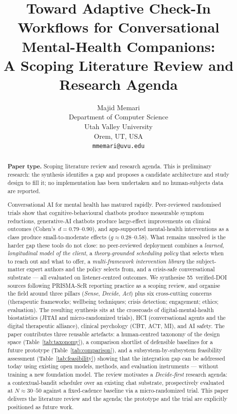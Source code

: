 \documentclass[10pt,conference]{article}
\title{Toward Adaptive Check-In Workflows for Conversational
Mental-Health Companions:\\A Scoping Literature Review and Research
Agenda}
\author{Majid Memari\\
Department of Computer Science\\
Utah Valley University\\
Orem, UT, USA\\
\texttt{mmemari@uvu.edu}}
\date{}
\newcommand{\tabref}[1]{Table~\ref{#1}}
\begin{document}
\maketitle

\begin{abstract}
\noindent\textbf{Paper type.} Scoping literature review and research
agenda. This is preliminary research: the synthesis identifies a gap
and proposes a candidate architecture and study design to fill it; no
implementation has been undertaken and no human-subjects data are
reported.

\smallskip
\noindent
Conversational AI for mental health has matured rapidly. Peer-reviewed
randomised trials show that cognitive-behavioural chatbots produce
measurable symptom reductions, generative-AI chatbots produce
large-effect improvements on clinical outcomes
(Cohen's~$d\!=\!0.79\text{--}0.90$), and app-supported mental-health
interventions as a class produce small-to-moderate effects
($g\!\approx\!0.28\text{--}0.58$). What remains unsolved is the harder
gap these tools do not close: no peer-reviewed deployment combines a
\emph{learned, longitudinal model of the client}, a
\emph{theory-grounded scheduling policy} that selects when to reach
out and what to offer, a \emph{multi-framework intervention library}
the subject-matter expert authors and the policy selects from, and a
crisis-safe conversational substrate --- all evaluated on
listener-centred outcomes. We synthesise 55~verified-DOI sources
following PRISMA-ScR reporting practice as a scoping review, and
organise the field around three pillars (\emph{Sense},
\emph{Decide}, \emph{Act}) plus six cross-cutting concerns
(therapeutic frameworks; wellbeing techniques; crisis detection;
engagement; ethics; evaluation). The resulting synthesis sits at
the crossroads of digital-mental-health biostatistics (JITAI and
micro-randomized trials), HCI (conversational agents and the digital
therapeutic alliance), clinical psychology (CBT, ACT, MI), and AI
safety. The paper contributes three reusable artefacts: a
human-centred taxonomy of the design space (\tabref{tab:taxonomy}), a
comparison shortlist of defensible baselines for a future prototype
(\tabref{tab:comparison}), and a subsystem-by-subsystem feasibility
assessment (\tabref{tab:feasibility}) showing that the integration
gap can be addressed today using existing open models, methods, and
evaluation instruments --- without training a new foundation model.
The review motivates a \emph{Decide-first} research agenda: a
contextual-bandit scheduler over an existing chat substrate,
prospectively evaluated at $N\!\approx\!30\text{--}50$ against a
fixed-cadence baseline via a micro-randomized trial. This paper
delivers the literature review and the agenda; the prototype and the
trial are explicitly positioned as future work.
\end{abstract}
\end{document}
